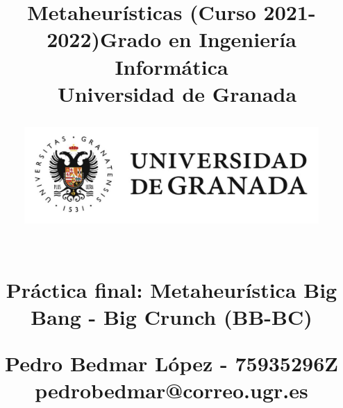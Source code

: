 



\title{	
\normalfont \normalsize 
\huge{\textbf{Metaheurísticas (Curso 2021-2022)}\linebreak \linebreak Grado en Ingeniería Informática \\ Universidad de Granada} \\ [23pt] %

\begin{figure}[H]
    \centering
        \includegraphics[scale=0.4]{img/ugr.png}
\end{figure}

\horrule{0.5pt} \\[0.4cm] %
\huge Práctica final: Metaheurística  \linebreak 
\huge Big Bang - Big Crunch (BB-BC) \linebreak %
\horrule{2pt} \\[0.5cm] %
\vspace{2cm}

\Large{Pedro Bedmar López - 75935296Z} \\
\Large{pedrobedmar@correo.ugr.es} \linebreak

}

\date{}




\clearpage
\maketitle %
\thispagestyle{empty}

